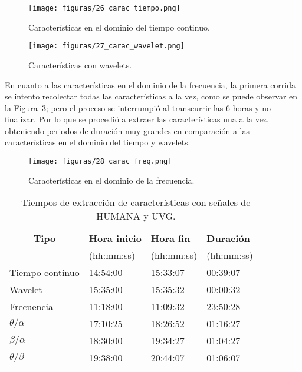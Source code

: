 \begin{figure}[H]
    \centering
    \texttt{[image: figuras/26\_carac\_tiempo.png]}
    \caption{Características en el dominio del tiempo continuo.}
    \label{fig: carac_tiempo}
\end{figure}

\begin{figure}[H]
    \centering
    \texttt{[image: figuras/27\_carac\_wavelet.png]}
    \caption{Características con wavelets.}
    \label{fig: carac_wavelets}
\end{figure}

En cuanto a las características en el dominio de la frecuencia, la primera corrida se intento recolectar todas las características a la vez, como se puede observar en la Figura~\ref{fig: carac_freq}; pero el proceso se interrumpió al transcurrir las 6 horas y no finalizar. Por lo que se procedió a extraer las características una a la vez, obteniendo periodos de duración muy grandes en comparación a las características en el dominio del tiempo y wavelets. 

\begin{figure}[H]
    \centering
    \texttt{[image: figuras/28\_carac\_freq.png]}
    \caption{Características en el dominio de la frecuencia.}
    \label{fig: carac_freq}
\end{figure}

\begin{table}[H]
\begin{center}
\begin{tabular}{|l|l|l|l|l|}
\hline
        \multicolumn{1}{|c|}{\textbf{Tipo}} &
   \textbf{ Hora inicio} & \textbf{Hora fin} & \textbf{Duración}\\ %
          & (hh:mm:ss)  & (hh:mm:ss) & (hh:mm:ss)\\ \hline
    Tiempo continuo     & 14:54:00  & 15:33:07 & 00:39:07   \\ \hline
    Wavelet             & 15:35:00  & 15:35:32 & 00:00:32   \\ \hline
    Frecuencia          & 11:18:00  & 11:09:32 & 23:50:28   \\ \hline
    $\theta/\alpha$     & 17:10:25  & 18:26:52 & 01:16:27   \\ \hline
    $\beta/\alpha $     & 18:30:00  & 19:34:27 & 01:04:27   \\ \hline
    $\theta/\beta $     & 19:38:00  & 20:44:07 & 01:06:07   \\ \hline
\end{tabular}
\caption[Tiempos de extracción de características]{Tiempos de extracción de características con señales de HUMANA y UVG.} 
\label{cuadro:Duracion caracteristicas}
\end{center}
\end{table}


